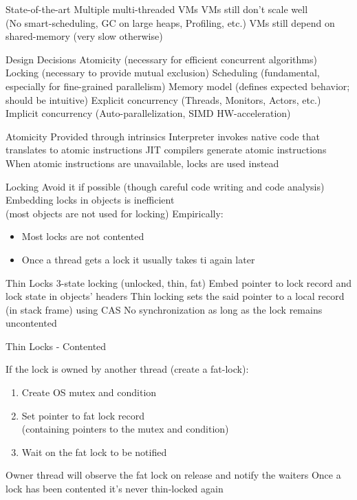 \documentclass[
14pt,
aspectratio=169,
usenames,
dvipsnames,
x11names]{beamer}
\begin{document}
\begin{frame}{State-of-the-art}
  Multiple multi-threaded VMs
  \vfill
  VMs still don't scale well\\ (No smart-scheduling, GC on large heaps, Profiling, etc.)
  \vfill
  VMs still depend on shared-memory (very slow otherwise)
\end{frame}

\begin{frame}{Design Decisions}
  Atomicity (necessary for efficient concurrent algorithms)
  \vfill
  Locking (necessary to provide mutual exclusion)
  \vfill
  Scheduling (fundamental, especially for fine-grained parallelism)
  \vfill
  Memory model (defines expected behavior; should be intuitive)
  \vfill
  Explicit concurrency (Threads, Monitors, Actors, etc.)
  \vfill
  Implicit concurrency (Auto-parallelization, SIMD HW-acceleration)
\end{frame}

\begin{frame}{Atomicity}
  Provided through intrinsics
  \vfill
  Interpreter invokes native code that translates to atomic instructions
  \vfill
  JIT compilers generate atomic instructions
  \vfill
  When atomic instructions are unavailable, locks are used instead
\end{frame}

\begin{frame}{Locking}
  Avoid it if possible (though careful code writing and code analysis)
  \vfill
  Embedding locks in objects is inefficient\\
  (most objects are not used for locking)
  \vfill
  Empirically:
  \begin{itemize}
  \item Most locks are not contented
  \item Once a thread gets a lock it usually takes ti again later
  \end{itemize}
\end{frame}

\begin{frame}{Thin Locks}
  3-state locking (unlocked, thin, fat)
  \vfill
  Embed pointer to lock record and lock state in objects' headers
  \vfill
  Thin locking sets the said pointer to a local record (in stack frame) using CAS
  \vfill
  No synchronization as long as the lock remains uncontented
\end{frame}

\begin{frame}{Thin Locks - Contented}

  If the lock is owned by another thread (create a fat-lock):
  \begin{enumerate}
  \item Create OS mutex and condition
  \item Set pointer to fat lock record\\ (containing pointers to the mutex and condition)
  \item Wait on the fat lock to be notified
  \end{enumerate}
  \vfill
  Owner thread will observe the fat lock on release and notify the waiters
  \vfill
  Once a lock has been contented it's never thin-locked again
\end{frame}
\end{document}
